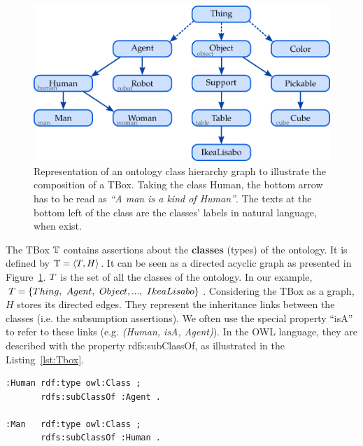 \begin{figure}[ht!]
\centering
\includegraphics[scale=0.4]{figures/chapter2/Tbox.png}
\caption{\label{fig:Tbox} Representation of an ontology class hierarchy graph to illustrate the composition of a TBox. Taking the class Human, the bottom arrow has to be read as \textit{``A man is a kind of Human''}. The texts at the bottom left of the class are the classes' labels in natural language, when exist.}
\end{figure}

The TBox $\mathbb{T}$ contains assertions about the \textbf{classes} (types) of the ontology. It is defined by $\mathbb{T} = \langle T, H \rangle$. It can be seen as a directed acyclic graph as presented in Figure~\ref{fig:Tbox}. $T$ is the set of all the classes of the ontology. In our example, $T = \{Thing,\ Agent,\ Object, ...,\ IkeaLisabo\}$. Considering the TBox as a graph, $H$ stores its directed edges. They represent the inheritance links between the classes (i.e. the subsumption assertions). We often use the special property ``isA'' to refer to these links (e.g. \textit{(Human, isA, Agent)}). In the OWL language, they are described with the property rdfs:subClassOf, as illustrated in the Listing~\ref{lst:Tbox}.

\noindent
\begin{minipage}{\textwidth}
\begin{lstlisting}[frame=single, basicstyle=\scriptsize\ttfamily, label={lst:Tbox}, caption={Description of ontology classes in the OWL language using the Turle syntax.},captionpos=b, style=OwlTurtle]
:Human rdf:type owl:Class ;
       rdfs:subClassOf :Agent .

:Man   rdf:type owl:Class ;
       rdfs:subClassOf :Human .
\end{lstlisting}
\end{minipage}

